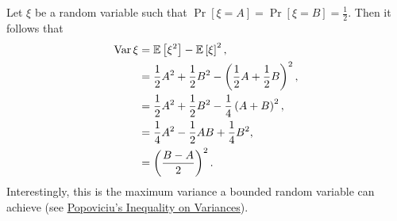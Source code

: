 \begin{problem}{4}
\end{problem}
\begin{solution}
    Let $\xi$ be a random variable such that $\Pr[\xi = A] = \Pr[\xi=B] = \frac{1}{2}$. Then it follows that 
    \begin{align*}
        \operatorname{Var}{\xi} &= \mathbb{E}\left[\xi^2\right] - \mathbb{E}\left[\xi\right]^2, \\
        &= \frac{1}{2}A^2 + \frac{1}{2}B^2 - \left(\frac{1}{2}A + \frac{1}{2}B\right)^2, \\
        &= \frac{1}{2}A^2 + \frac{1}{2}B^2 - \frac{1}{4}\left(A + B\right)^2, \\
        &= \frac{1}{4}A^2 - \frac{1}{2}AB + \frac{1}{4}B^2, \\
        &= \left(\frac{B-A}{2}\right)^2.
    \end{align*}
    Interestingly, this is the maximum variance a bounded random variable can achieve (see \href{https://en.wikipedia.org/wiki/Popoviciu%27s_inequality_on_variances}{Popoviciu's Inequality on Variances}).
\end{solution}

\begin{problem}{5}
\end{problem}
\begin{solution}
\end{solution}

\begin{problem}{6}
\end{problem}
\begin{solution}
\end{solution}

\begin{problem}{7}
\end{problem}
\begin{solution}
\end{solution}

\begin{problem}{8}
\end{problem}
\begin{solution}
\end{solution}

\begin{problem}{9}
\end{problem}
\begin{solution}
\end{solution}

\begin{problem}{10}
\end{problem}
\begin{solution}
\end{solution}

\begin{problem}{11}
\end{problem}
\begin{solution}
\end{solution}

\begin{problem}{12}
\end{problem}
\begin{solution}
\end{solution}

\begin{problem}{13}
\end{problem}
\begin{solution}
\end{solution}